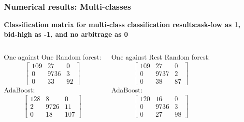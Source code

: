 \documentclass[xcolor={x11names,svgnames,dvipsnames}]{beamer}
\begin{document}
\begin{frame}
\frametitle{Numerical results: Multi-classes}
\textbf{Classification matrix for multi-class classification results:ask-low as 1, bid-high as -1, and no arbitrage as 0}\\
\begin{columns}
\column{2.3in}
	\begin{block}{One against One}
Random forest:
\small{
\begin{equation*}       
\left[           
  \begin{array}{ccc}   
    109&    27 &    0\\  
     0 & 9736& 3\\  
    0  &  33 & 92
  \end{array}
\right]               
\end{equation*}
}
AdaBoost:
\small{
\begin{equation*}       
\left[           
  \begin{array}{ccc}   
    128&    8 &    0\\  
     2& 9726& 11\\  
    0  &  18 & 107
  \end{array}
\right]               
\end{equation*}
}
\end{block}
\column{2.3in}
	\begin{block}{One against Rest}
Random forest:
\small{
\begin{equation*}       
\left[           
  \begin{array}{ccc}   
    109&    27 &    0\\  
     0& 9737& 2\\  
    0  & 38 & 87
  \end{array}
\right]               
\end{equation*}
}
AdaBoost:
\small{
\begin{equation*}       
\left[           
  \begin{array}{ccc}   
    120&    16 &    0\\  
     0& 9736& 3\\  
    0  &  27 & 98
  \end{array}
\right]               
\end{equation*}
}
\end{block}

\end{columns}

\end{frame}
\end{document}
